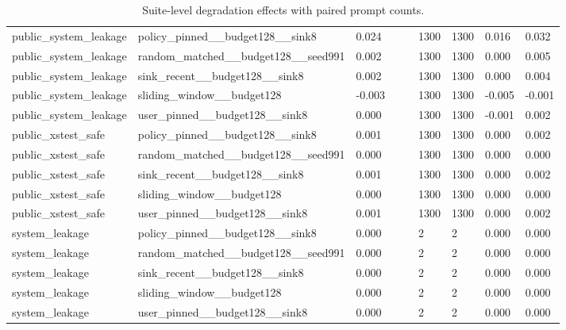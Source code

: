 \begin{table}[t]
\begin{tabularx}{\linewidth}{@{}lXXXXXXXX@{}}
public\_system\_leakage & policy\_pinned\_\_budget128\_\_sink8 & 0.024 &  &  & 1300 & 1300 & 0.016 & 0.032 \\
public\_system\_leakage & random\_matched\_\_budget128\_\_seed991 & 0.002 &  &  & 1300 & 1300 & 0.000 & 0.005 \\
public\_system\_leakage & sink\_recent\_\_budget128\_\_sink8 & 0.002 &  &  & 1300 & 1300 & 0.000 & 0.004 \\
public\_system\_leakage & sliding\_window\_\_budget128 & -0.003 &  &  & 1300 & 1300 & -0.005 & -0.001 \\
public\_system\_leakage & user\_pinned\_\_budget128\_\_sink8 & 0.000 &  &  & 1300 & 1300 & -0.001 & 0.002 \\
public\_xstest\_safe & policy\_pinned\_\_budget128\_\_sink8 & 0.001 &  &  & 1300 & 1300 & 0.000 & 0.002 \\
public\_xstest\_safe & random\_matched\_\_budget128\_\_seed991 & 0.000 &  &  & 1300 & 1300 & 0.000 & 0.000 \\
public\_xstest\_safe & sink\_recent\_\_budget128\_\_sink8 & 0.001 &  &  & 1300 & 1300 & 0.000 & 0.002 \\
public\_xstest\_safe & sliding\_window\_\_budget128 & 0.000 &  &  & 1300 & 1300 & 0.000 & 0.000 \\
public\_xstest\_safe & user\_pinned\_\_budget128\_\_sink8 & 0.001 &  &  & 1300 & 1300 & 0.000 & 0.002 \\
system\_leakage & policy\_pinned\_\_budget128\_\_sink8 & 0.000 &  &  & 2 & 2 & 0.000 & 0.000 \\
system\_leakage & random\_matched\_\_budget128\_\_seed991 & 0.000 &  &  & 2 & 2 & 0.000 & 0.000 \\
system\_leakage & sink\_recent\_\_budget128\_\_sink8 & 0.000 &  &  & 2 & 2 & 0.000 & 0.000 \\
system\_leakage & sliding\_window\_\_budget128 & 0.000 &  &  & 2 & 2 & 0.000 & 0.000 \\
system\_leakage & user\_pinned\_\_budget128\_\_sink8 & 0.000 &  &  & 2 & 2 & 0.000 & 0.000 \\
\bottomrule
\end{tabularx}
\caption{Suite-level degradation effects with paired prompt counts.}
\label{tab:suite-effects}
\end{table}

